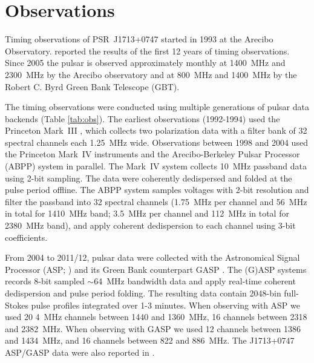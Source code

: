 \section{Observations}
Timing observations of PSR~J1713+0747 started in 1993 at the Arecibo
Observatory. \citet{sns+05} reported the results of the first 12 years
of timing observations. Since 2005 the pulsar is observed approximately monthly
at 1400~MHz and 2300~MHz by the Arecibo
observatory and at 800~MHz and 1400~MHz by the Robert C. Byrd Green Bank
Telescope (GBT).

The timing observations were conducted using multiple generations of pulsar
data backends (Table \ref{tab:obs}).
The earliest observations (1992-1994) used the Princeton Mark~III
\citep{skn+92}, which collects two polarization data with a filter bank of 32
spectral channels each 1.25~MHz wide. 
Observations between 1998 and 2004 used the Princeton Mark~IV
\citep{sst+00} instruments and the Arecibo-Berkeley Pulsar Processor
(ABPP) system \citep{bdz+97} in parallel. 
The Mark~IV system collects 10~MHz passband data using 2-bit sampling. The
data were coherently dedispersed and folded at the pulse period offline.
The ABPP system samples voltages with 2-bit resolution and filter the passband 
into 32 spectral channels (1.75~MHz
per channel and 56~MHz in total for 1410~MHz band; 3.5~MHz per channel and 
112~MHz in total for 2380~MHz band), and apply coherent dedispersion to each
channel using 3-bit coefficients. 

From 2004 to 2011/12, pulsar data were collected with the Astronomical Signal
Processor (ASP; \citealt{dem07}) and its Green Bank counterpart GASP \citep{dem07}.
The (G)ASP systems records 8-bit sampled $\sim$64~MHz bandwidth data and apply real-time
coherent dedispersion and pulse period folding. The resulting data contain
2048-bin full-Stokes pulse profiles integrated over 1-3 minutes. 
When observing with ASP we used 20 4~MHz channels between 1440 and
1360~MHz, 16 channels between 2318 and 2382~MHz. 
When observing with GASP we used 12 channels between 1386 and 1434~MHz, and 16
channels between 822 and 886~MHz.
The J1713+0747 ASP/GASP data were also reported in \citet{dfg+13}.

